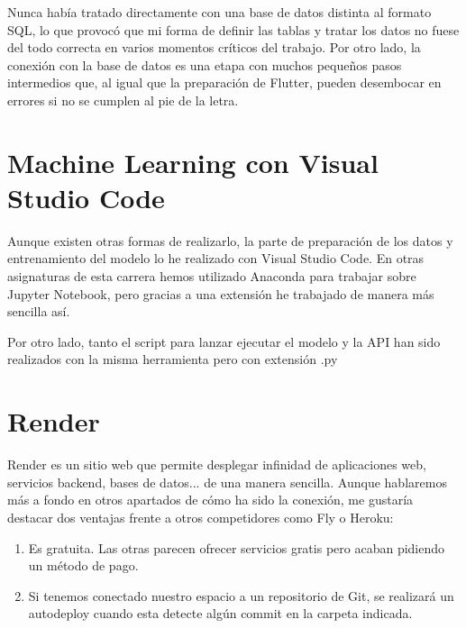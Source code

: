 	Nunca había tratado directamente con una base de datos distinta al formato SQL, lo que provocó que mi forma de definir las tablas y tratar los datos no fuese del todo correcta en varios momentos críticos del trabajo. Por otro lado, la conexión con la base de datos es una etapa con muchos pequeños pasos intermedios que, al igual que la preparación de Flutter, pueden desembocar en errores si no se cumplen al pie de la letra.


\section{Machine Learning con Visual Studio Code}

	Aunque existen otras formas de realizarlo, la parte de preparación de los datos y entrenamiento del modelo lo he realizado con Visual Studio Code. En otras asignaturas de esta carrera hemos utilizado Anaconda para trabajar sobre Jupyter Notebook, pero gracias a una extensión he trabajado de manera más sencilla así. 
	
	Por otro lado, tanto el script para lanzar ejecutar el modelo y la API han sido realizados con la misma herramienta pero con extensión .py	
	
\section{Render}

	Render es un sitio web que permite desplegar infinidad de aplicaciones web, servicios backend, bases de datos... de una manera sencilla. Aunque hablaremos más a fondo en otros apartados de cómo ha sido la conexión, me gustaría destacar dos ventajas frente a otros competidores como Fly o Heroku:
	\begin{enumerate}
		\item Es gratuita. Las otras parecen ofrecer servicios gratis pero acaban pidiendo un método de pago.
		\item Si tenemos conectado nuestro espacio a un repositorio de Git, se realizará un autodeploy cuando esta detecte algún commit en la carpeta indicada.
	\end{enumerate}
